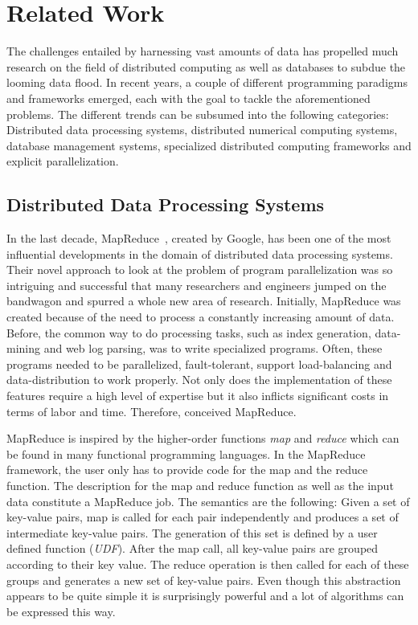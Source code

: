 \chapter{Related Work}
\label{cha:relatedwork}


The challenges entailed by harnessing vast amounts of data has propelled much research on the field of distributed computing as well as databases to subdue the looming data flood.
In recent years, a couple of different programming paradigms and frameworks emerged, each with the goal to tackle the aforementioned problems.
The different trends can be subsumed into the following categories: Distributed data processing systems, distributed numerical computing systems, database management systems, specialized distributed computing frameworks and explicit parallelization.

\section{Distributed Data Processing Systems}

In the last decade, MapReduce~\cite{dean:c2008a}, created by Google, has been one of the most influential developments in the domain of distributed data processing systems.
Their novel approach to look at the problem of program parallelization was so intriguing and successful that many researchers and engineers jumped on the bandwagon and spurred a whole new area of research.
Initially, MapReduce was created because of the need to process a constantly increasing amount of data.
Before, the common way to do processing tasks, such as index generation, data-mining and web log parsing, was to write specialized programs.
Often, these programs needed to be parallelized, fault-tolerant, support load-balancing and data-distribution to work properly.
Not only does the implementation of these features require a high level of expertise but it also inflicts significant costs in terms of labor and time.
Therefore, \citeauthor{dean:c2008a} conceived MapReduce.

MapReduce is inspired by the higher-order functions \emph{map} and \emph{reduce} which can be found in many functional programming languages.
In the MapReduce framework, the user only has to provide code for the map and the reduce function.
The description for the map and reduce function as well as the input data constitute a MapReduce job.
The semantics are the following:
Given a set of key-value pairs, map is called for each pair independently and produces a set of intermediate key-value pairs.
The generation of this set is defined by a user defined function (\emph{UDF}).
After the map call, all key-value pairs are grouped according to their key value.
The reduce operation is then called for each of these groups and generates a new set of key-value pairs.
Even though this abstraction appears to be quite simple it is surprisingly powerful and a lot of algorithms can be expressed this way.


